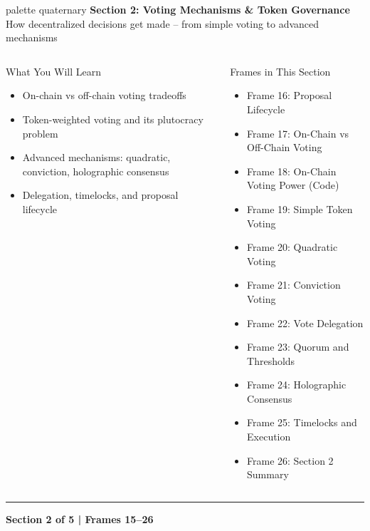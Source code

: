 \documentclass[8pt,aspectratio=169]{beamer}
\newcommand{\bottomnote}[1]{\vfill\vspace{-2mm}\textcolor{mllavender2}{\rule{\textwidth}{0.4pt}}\vspace{1mm}\footnotesize\textbf{#1}}
\begin{document}
\begin{frame}{}
\begin{beamercolorbox}[sep=12pt,center,rounded=true,shadow=true]{palette quaternary}
  {\Large\bfseries Section 2: Voting Mechanisms \& Token Governance}\\[6pt]
  {\normalsize How decentralized decisions get made -- from simple voting to advanced mechanisms}
\end{beamercolorbox}
\vspace{4mm}
\begin{columns}[T]
\begin{block}{What You Will Learn}
\footnotesize
\begin{itemize}
  \item On-chain vs off-chain voting tradeoffs
  \item Token-weighted voting and its plutocracy problem
  \item Advanced mechanisms: quadratic, conviction, holographic consensus
  \item Delegation, timelocks, and proposal lifecycle
\end{itemize}
\end{block}
\begin{block}{Frames in This Section}
\footnotesize
\begin{itemize}
  \item Frame 16: Proposal Lifecycle
  \item Frame 17: On-Chain vs Off-Chain Voting
  \item Frame 18: On-Chain Voting Power (Code)
  \item Frame 19: Simple Token Voting
  \item Frame 20: Quadratic Voting
  \item Frame 21: Conviction Voting
  \item Frame 22: Vote Delegation
  \item Frame 23: Quorum and Thresholds
  \item Frame 24: Holographic Consensus
  \item Frame 25: Timelocks and Execution
  \item Frame 26: Section 2 Summary
\end{itemize}
\end{block}
\end{columns}
\bottomnote{Section 2 of 5 | Frames 15--26}
\end{frame}
\end{document}
